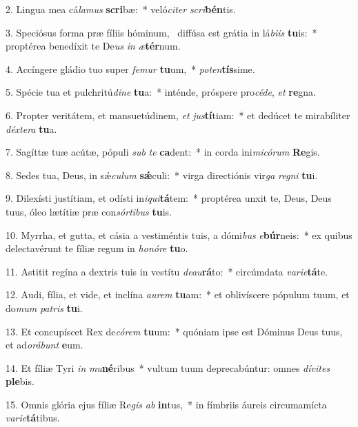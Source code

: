 2. Lingua mea cá\textit{la}\textit{mus} \textbf{scri}bæ:~*  veló\textit{ci}\textit{ter} \textit{scri}\textbf{bén}tis.\

3. Speciósus forma præ fíliis hóminum, \dag\  diffúsa est grátia in lá\textit{bi}\textit{is} \textbf{tu}is:~*  proptérea benedíxit te De\textit{us} \textit{in} \textit{æ}\textbf{tér}num.\

4. Accíngere gládio tuo super \textit{fe}\textit{mur} \textbf{tu}um,~*  \textit{pot}\textit{en}\textbf{tís}sime.\

5. Spécie tua et pulchritú\textit{di}\textit{ne} \textbf{tu}a:~*  inténde, próspere pro\textit{cé}\textit{de}, \textit{et} \textbf{re}gna.\

6. Propter veritátem, et mansuetúdinem, \textit{et} \textit{jus}\textbf{tí}tiam:~*  et dedúcet te mirabíliter \textit{déx}\textit{te}\textit{ra} \textbf{tu}a.\

7. Sagíttæ tuæ acútæ, pópuli \textit{sub} \textit{te} \textbf{ca}dent:~*  in corda ini\textit{mi}\textit{có}\textit{rum} \textbf{Re}gis.\

8. Sedes tua, Deus, in sǽ\textit{cu}\textit{lum} \textbf{sǽ}culi:~*  virga directiónis vir\textit{ga} \textit{re}\textit{gni} \textbf{tu}i.\

9. Dilexísti justítiam, et odísti in\textit{i}\textit{qui}\textbf{tá}tem:~*  proptérea unxit te, Deus, Deus tuus, óleo lætítiæ præ con\textit{sór}\textit{ti}\textit{bus} \textbf{tu}is.\

10. Myrrha, et gutta, et cásia a vestiméntis tuis, a dómi\textit{bus} \textit{e}\textbf{búr}neis:~*  ex quibus delectavérunt te fíliæ regum in \textit{ho}\textit{nó}\textit{re} \textbf{tu}o.\

11. Astitit regína a dextris tuis in vestítu \textit{de}\textit{au}\textbf{rá}to:~*  circúmdata \textit{va}\textit{ri}\textit{e}\textbf{tá}te.\

12. Audi, fília, et vide, et inclína \textit{au}\textit{rem} \textbf{tu}am:~*  et oblivíscere pópulum tuum, et do\textit{mum} \textit{pa}\textit{tris} \textbf{tu}i.\

13. Et concupíscet Rex de\textit{có}\textit{rem} \textbf{tu}um:~*  quóniam ipse est Dóminus Deus tuus, et ad\textit{o}\textit{rá}\textit{bunt} \textbf{e}um.\

14. Et fíliæ Tyri \textit{in} \textit{mu}\textbf{né}ribus~*  vultum tuum deprecabúntur: omnes \textit{dí}\textit{vi}\textit{tes} \textbf{ple}bis.\

15. Omnis glória ejus fíliæ Re\textit{gis} \textit{ab} \textbf{in}tus,~*  in fímbriis áureis circumamícta \textit{va}\textit{ri}\textit{e}\textbf{tá}tibus.\

